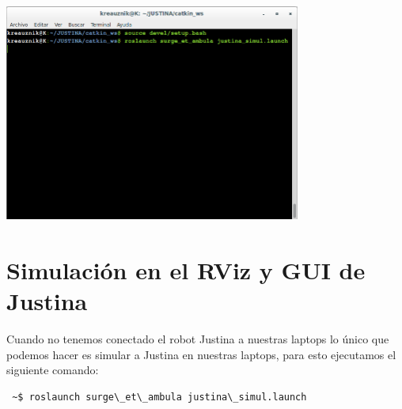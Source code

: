 \documentclass[user_manual.tex]{subfiles}
\begin{document}
 \begin{center}
\includegraphics[width=0.73\textwidth]{Figures/PP/pp6.png}
\end{center}
\section{Simulación en el RViz y GUI de Justina}
Cuando no tenemos conectado el robot Justina a nuestras laptops lo único que podemos hacer
es simular a Justina en nuestras laptops, para esto ejecutamos el siguiente comando:
\begin{verbatim}
 ~$ roslaunch surge\_et\_ambula justina\_simul.launch
\end{verbatim}
\end{document}
